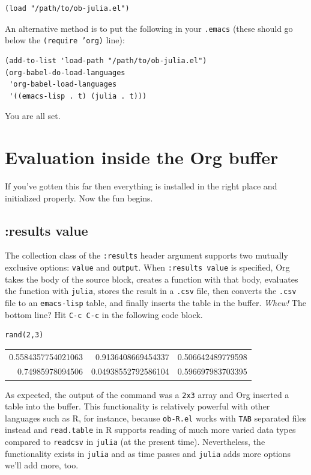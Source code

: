 \documentclass[11pt]{article}
\begin{document}
\begin{verbatim}
(load "/path/to/ob-julia.el")
\end{verbatim}

An alternative method is to put the following in your \texttt{.emacs} (these
should go below the \texttt{(require 'org)} line):

\begin{verbatim}
(add-to-list 'load-path "/path/to/ob-julia.el")
(org-babel-do-load-languages
 'org-babel-load-languages
 '((emacs-lisp . t) (julia . t)))
\end{verbatim}

You are all set.
\section[Evaluation inside the Org buffer]{Evaluation inside the Org buffer}
\label{sec-2}

If you've gotten this far then everything is installed in the right
place and initialized properly. Now the fun begins.

\subsection[:results value]{:results value}
\label{sec-2-1}

The collection class of the \texttt{:results} header argument supports two mutually exclusive options: \texttt{value} and \texttt{output}.  When \texttt{:results value} is specified, Org takes the body of the source block, creates a function with that body, evaluates the function with \texttt{julia}, stores the result in a \texttt{.csv} file, then converts the \texttt{.csv} file to an \texttt{emacs-lisp} table, and finally inserts the table in the buffer.  \emph{Whew!}  The bottom line?  Hit \texttt{C-c C-c} in the following code block.

\begin{verbatim}
rand(2,3)
\end{verbatim}

\begin{center}
\begin{tabular}{rrr}
0.5584357754021063 & 0.9136408669454337 & 0.506642489779598\\
0.74985978094506 & 0.04938552792586104 & 0.596697983703395\\
\end{tabular}
\end{center}

As expected, the output of the command was a \texttt{2x3} array and Org inserted a table into the buffer.  This functionality is relatively powerful with other languages such as R, for instance, because \texttt{ob-R.el} works with \texttt{TAB} separated files instead and \texttt{read.table} in R supports reading of much more varied data types compared to \texttt{readcsv} in \texttt{julia} (at the present time).  Nevertheless, the functionality exists in \texttt{julia} and as time passes and \texttt{julia} adds more options we'll add more, too.  
\end{document}
